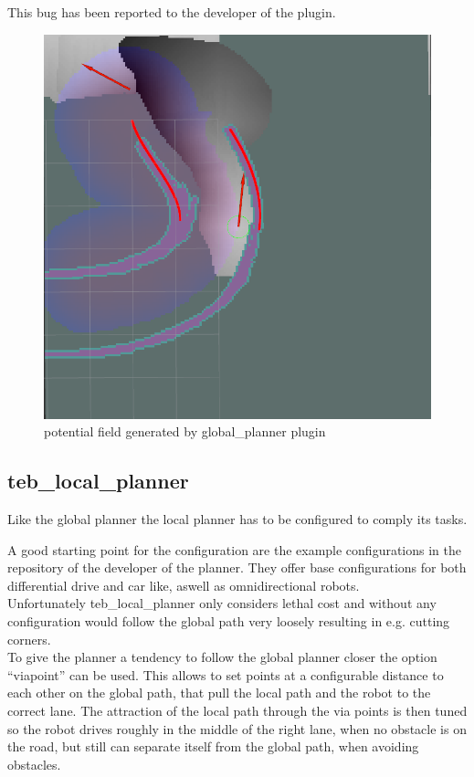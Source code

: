  This bug has been reported to the developer of the plugin.
 
 \begin{figure}[H]
 	\centering
 	\includegraphics[width=.7\textwidth]{Pictures/out of bounds}	
 	
 	\caption{potential field generated by global\_planner plugin}
 	\label{potentialfield}
 \end{figure}


\subsection{teb\_local\_planner}

Like the global planner the local planner has to be configured to comply its tasks.

A good starting point for the configuration are the example configurations in the repository of the developer of the planner\cite{tebtutorials}. They offer base configurations for both differential drive and car like, aswell as omnidirectional robots.\\

Unfortunately teb\_local\_planner only considers lethal cost and without any configuration would follow the global path very loosely resulting in e.g. cutting corners.\\ 

To give the planner a tendency to follow the global planner closer the option ``viapoint'' can be used. This allows to set points at a configurable distance to each other on the global path, that pull the local path and the robot to the correct lane. The attraction of the local path through the via points is then tuned so the robot drives roughly in the middle of the right lane, when no obstacle is on the road, but still can separate itself from the global path, when avoiding obstacles.\\

